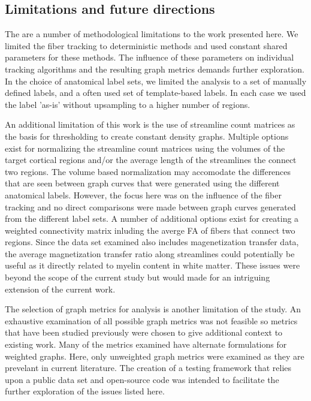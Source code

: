 \documentclass{frontiersSCNS} %
\begin{document}
\subsection{Limitations and future directions}
The are a number of methodological limitations to the work presented here. We limited the fiber tracking to deterministic
methods and used constant shared parameters for these methods. The influence of these parameters on individual 
tracking algorithms and the resulting graph metrics demands further exploration. In the choice of anatomical label sets, we
limited the analysis to a set of manually defined labels, and a often used set of template-based labels. In each case we used the label
'as-is' without upsampling to a higher number of regions. 

An additional limitation of this work is the use of streamline count matrices as the basis for thresholding to create constant
density graphs. Multiple options exist for normalizing the streamline count matrices using the volumes of 
the target cortical regions and/or the average length of the streamlines the connect two regions. The volume based
normalization may accomodate the differences that are seen between graph curves that were generated using 
the different anatomical labels. However, the focus here was on the influence of the fiber tracking and no direct
comparisons were made between graph curves generated from the different label sets. A number of additional options
exist for creating a weighted connectivity matrix inluding the averge FA of fibers that connect two regions. Since the data set
examined also includes magenetization transfer data, the average magnetization transfer ratio along streamlines 
could potentially be useful as it directly related to myelin content in white matter. These issues were beyond the scope 
of the current study but would made for an intriguing extension of the current work. 

The selection of graph metrics for analysis is another limitation of the study. An exhaustive examination of all
possible graph metrics was not feasible so metrics that have been studied previously were chosen to give additional
context to existing work. Many of the metrics examined have alternate formulations for 
weighted graphs. Here, only unweighted graph metrics were examined as they are prevelant in current literature.
 The creation of a testing framework that relies upon a public data set and open-source code
was intended to facilitate the further exploration of the issues listed here.
\end{document}
